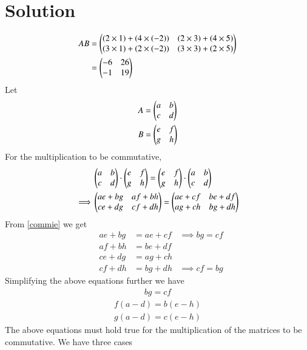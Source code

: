 \documentclass[journal,12pt,twocolumn]{IEEEtran}
\begin{document}
\section{Solution}
\begin{align}
AB&=\begin{pmatrix}(2 \times 1) +(4 \times (-2)) &(2 \times 3) +(4 \times 5)\\(3 \times 1) +(2 \times (-2)) &(3 \times 3) +(2 \times 5)\end{pmatrix}\\
&=\begin{pmatrix}-6 &26\\-1 &19\end{pmatrix}
\end{align}
Let 
\begin{align}
    A&=\begin{pmatrix}a &b\\c &d\end{pmatrix}\\
    B&=\begin{pmatrix}e &f\\g &h\end{pmatrix}
\end{align}
For the multiplication to be commutative,
\begin{align}
    &\begin{pmatrix}a &b\\c &d\end{pmatrix} \cdot \begin{pmatrix}e &f\\g &h\end{pmatrix}=\begin{pmatrix}e &f\\g &h\end{pmatrix} \cdot \begin{pmatrix}a &b\\c &d\end{pmatrix}\\
    \implies& \begin{pmatrix}ae + bg & af + bh \\
ce + dg & cf + dh\end{pmatrix}= \begin{pmatrix}ae + cf & be + df \\
ag + ch & bg + dh\end{pmatrix} \label{commie}
\end{align}
From \eqref{commie} we get
\begin{align}
  & ae + bg &= ae + cf &\implies bg = cf \\
  & af + bh &= be + df\\
 & ce + dg &= ag + ch\\
 & cf + dh &= bg + dh &\implies cf = bg
\end{align}
Simplifying the above equations further we have
\begin{align}
     bg = cf 
\end{align}
\begin{align}\label{one}
 f (a - d) = b (e - h)
 \end{align}
 \begin{align}\label{two}
 g (a - d) = c (e - h) 
\end{align}
The above equations must hold true for the multiplication of the matrices to be commutative. We have three cases
\end{document}
